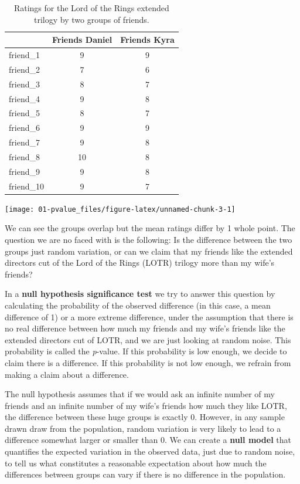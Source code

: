 \documentclass[
  oneside]{book}
\begin{document}
\begin{table}

\caption{\label{tab:friends}Ratings for the Lord of the Rings extended trilogy by two groups of friends.}
\begin{tabular}[t]{lcc}
\toprule
 & Friends Daniel & Friends Kyra\\
\midrule
friend\_1 & 9 & 9\\
friend\_2 & 7 & 6\\
friend\_3 & 8 & 7\\
friend\_4 & 9 & 8\\
friend\_5 & 8 & 7\\
\addlinespace
friend\_6 & 9 & 9\\
friend\_7 & 9 & 8\\
friend\_8 & 10 & 8\\
friend\_9 & 9 & 8\\
friend\_10 & 9 & 7\\
\bottomrule
\end{tabular}
\end{table}

\begin{center}\texttt{[image: 01-pvalue\_files/figure-latex/unnamed-chunk-3-1]} \end{center}

We can see the groups overlap but the mean ratings differ by 1 whole point. The question we are no faced with is the following: Is the difference between the two groups just random variation, or can we claim that my friends like the extended directors cut of the Lord of the Rings (LOTR) trilogy more than my wife's friends?

In a \textbf{null hypothesis significance test} we try to answer this question by calculating the probability of the observed difference (in this case, a mean difference of 1) or a more extreme difference, under the assumption that there is no real difference between how much my friends and my wife's friends like the extended directors cut of LOTR, and we are just looking at random noise. This probability is called the \emph{p}-value. If this probability is low enough, we decide to claim there is a difference. If this probability is not low enough, we refrain from making a claim about a difference.

The null hypothesis assumes that if we would ask an infinite number of my friends and an infinite number of my wife's friends how much they like LOTR, the difference between these huge groups is exactly 0. However, in any sample drawn draw from the population, random variation is very likely to lead to a difference somewhat larger or smaller than 0. We can create a \textbf{null model} that quantifies the expected variation in the observed data, just due to random noise, to tell us what constitutes a reasonable expectation about how much the differences between groups can vary if there is no difference in the population.
\end{document}
